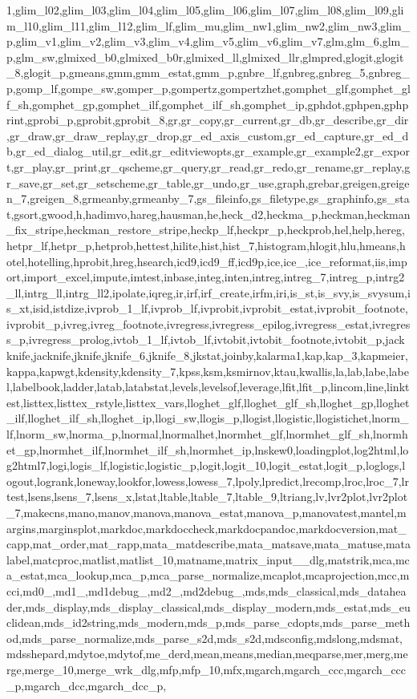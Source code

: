 {{1,glim_l02,glim_l03,glim_l04,glim_l05,glim_l06,glim_l07,glim_l08,glim_l09,glim_l10,glim_l11,glim_l12,glim_lf,glim_mu,glim_nw1,glim_nw2,glim_nw3,glim_p,glim_v1,glim_v2,glim_v3,glim_v4,glim_v5,glim_v6,glim_v7,glm,glm_6,glm_p,glm_sw,glmixed_b0,glmixed_b0r,glmixed_ll,glmixed_llr,glmpred,glogit,glogit_8,glogit_p,gmeans,gmm,gmm_estat,gmm_p,gnbre_lf,gnbreg,gnbreg_5,gnbreg_p,gomp_lf,gompe_sw,gomper_p,gompertz,gompertzhet,gomphet_glf,gomphet_glf_sh,gomphet_gp,gomphet_ilf,gomphet_ilf_sh,gomphet_ip,gphdot,gphpen,gphprint,gprobi_p,gprobit,gprobit_8,gr,gr_copy,gr_current,gr_db,gr_describe,gr_dir,gr_draw,gr_draw_replay,gr_drop,gr_ed_axis_custom,gr_ed_capture,gr_ed_db,gr_ed_dialog_util,gr_edit,gr_editviewopts,gr_example,gr_example2,gr_export,gr_play,gr_print,gr_qscheme,gr_query,gr_read,gr_redo,gr_rename,gr_replay,gr_save,gr_set,gr_setscheme,gr_table,gr_undo,gr_use,graph,grebar,greigen,greigen_7,greigen_8,grmeanby,grmeanby_7,gs_fileinfo,gs_filetype,gs_graphinfo,gs_stat,gsort,gwood,h,hadimvo,hareg,hausman,he,heck_d2,heckma_p,heckman,heckman_fix_stripe,heckman_restore_stripe,heckp_lf,heckpr_p,heckprob,hel,help,hereg,hetpr_lf,hetpr_p,hetprob,hettest,hilite,hist,hist_7,histogram,hlogit,hlu,hmeans,hotel,hotelling,hprobit,hreg,hsearch,icd9,icd9_ff,icd9p,ice,ice_,ice_reformat,iis,import,import_excel,impute,imtest,inbase,integ,inten,intreg,intreg_7,intreg_p,intrg2_ll,intrg_ll,intrg_ll2,ipolate,iqreg,ir,irf,irf_create,irfm,iri,is_st,is_svy,is_svysum,is_xt,isid,istdize,ivprob_1_lf,ivprob_lf,ivprobit,ivprobit_estat,ivprobit_footnote,ivprobit_p,ivreg,ivreg_footnote,ivregress,ivregress_epilog,ivregress_estat,ivregress_p,ivregress_prolog,ivtob_1_lf,ivtob_lf,ivtobit,ivtobit_footnote,ivtobit_p,jackknife,jacknife,jknife,jknife_6,jknife_8,jkstat,joinby,kalarma1,kap,kap_3,kapmeier,kappa,kapwgt,kdensity,kdensity_7,kpss,ksm,ksmirnov,ktau,kwallis,la,lab,labe,label,labelbook,ladder,latab,latabstat,levels,levelsof,leverage,lfit,lfit_p,lincom,line,linktest,listtex,listtex_rstyle,listtex_vars,lloghet_glf,lloghet_glf_sh,lloghet_gp,lloghet_ilf,lloghet_ilf_sh,lloghet_ip,llogi_sw,llogis_p,llogist,llogistic,llogistichet,lnorm_lf,lnorm_sw,lnorma_p,lnormal,lnormalhet,lnormhet_glf,lnormhet_glf_sh,lnormhet_gp,lnormhet_ilf,lnormhet_ilf_sh,lnormhet_ip,lnskew0,loadingplot,log2html,log2html7,logi,logis_lf,logistic,logistic_p,logit,logit_10,logit_estat,logit_p,loglogs,logout,logrank,loneway,lookfor,lowess,lowess_7,lpoly,lpredict,lrecomp,lroc,lroc_7,lrtest,lsens,lsens_7,lsens_x,lstat,ltable,ltable_7,ltable_9,ltriang,lv,lvr2plot,lvr2plot_7,makecns,mano,manov,manova,manova_estat,manova_p,manovatest,mantel,margins,marginsplot,markdoc,markdoccheck,markdocpandoc,markdocversion,mat_capp,mat_order,mat_rapp,mata_matdescribe,mata_matsave,mata_matuse,matalabel,matcproc,matlist,matlist_10,matname,matrix_input__dlg,matstrik,mca,mca_estat,mca_lookup,mca_p,mca_parse_normalize,mcaplot,mcaprojection,mcc,mcci,md0_,md1_,md1debug_,md2_,md2debug_,mds,mds_classical,mds_dataheader,mds_display,mds_display_classical,mds_display_modern,mds_estat,mds_euclidean,mds_id2string,mds_modern,mds_p,mds_parse_cdopts,mds_parse_method,mds_parse_normalize,mds_parse_s2d,mds_s2d,mdsconfig,mdslong,mdsmat,mdsshepard,mdytoe,mdytof,me_derd,mean,means,median,meqparse,mer,merg,merge,merge_10,merge_wrk_dlg,mfp,mfp_10,mfx,mgarch,mgarch_ccc,mgarch_ccc_p,mgarch_dcc,mgarch_dcc_p,}}
